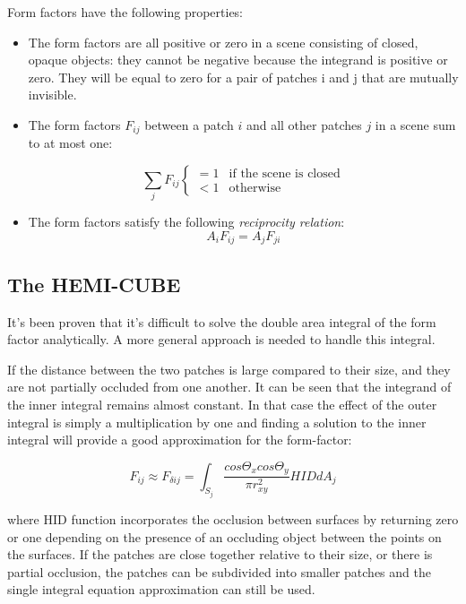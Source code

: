 Form factors have the following properties:

\begin{itemize}
	\item The form factors are all positive or zero in a scene consisting of closed, opaque objects: they cannot be negative because the integrand is positive or zero. They will be equal to zero for a pair of patches i and j that are mutually invisible.
	\item The form factors $F_{ij}$ between a patch $i$ and all other patches $j$ in a scene sum to at most one:
	
		\begin{equation*}
			\sum_j F_{ij}\begin{cases}
				  =1  & \text{if the scene is closed}\\
			      <1  & \text{otherwise } 
				\end{cases}
		\end{equation*}
	\item The form factors satisfy the following \textit{reciprocity relation}:
		\begin{equation*}
			A_iF_{ij}=A_jF_{ji}
		\end{equation*}
\end{itemize}




\subsection{The HEMI-CUBE}\label{sec:the-hemi-cube}
It's been proven that it's difficult to solve the double area integral of the form factor analytically. A more general approach is needed to handle this integral. 

If the distance between the two patches is large compared to their size, and they are not partially occluded from one another. It can be seen that the integrand of the inner integral remains almost constant. In that case the effect of the outer integral is simply a multiplication by one and finding a solution to the inner integral will provide a good approximation for the form-factor:

\begin{equation}\label{e:single-integral}
	F_{ij}\approx F_{\delta ij}=\int_{S_j}\frac{cos\Theta_x cos\Theta_y}{\pi r^{2}_{xy}} HID dA_j
\end{equation}

where HID function incorporates the occlusion between surfaces by returning zero or one depending on the presence of an occluding object between the points on the surfaces. If the patches are close together relative to their size, or there is partial occlusion, the patches can be subdivided into smaller patches and the single integral equation approximation can still be used.

